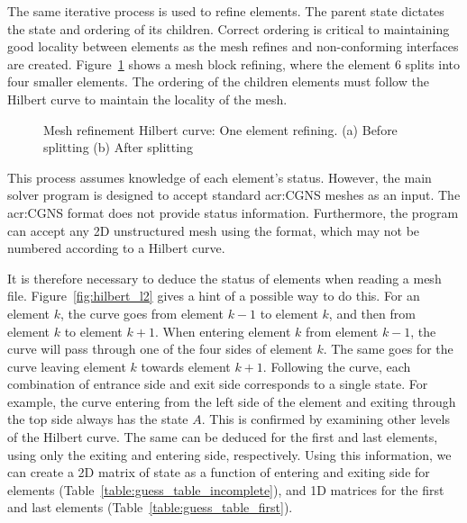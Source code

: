 The same iterative process is used to refine elements. The parent state dictates the state and
ordering of its children. Correct ordering is critical to maintaining good locality between elements
as the mesh refines and non-conforming interfaces are created. Figure~\ref{fig:hilbert_refining}
shows a mesh block refining, where the element \(6\) splits into four smaller elements. The ordering
of the children elements must follow the Hilbert curve to maintain the locality of the mesh.

\begin{figure}[H]
    \centering
    \hfill
    \caption{Mesh refinement Hilbert curve: One element refining. (a) Before splitting (b) After splitting}\label{fig:hilbert_refining}
\end{figure}

This process assumes knowledge of each element's status. However, the main solver program is
designed to accept standard \acrshort{acr:CGNS} meshes as an input. The \acrshort{acr:CGNS} format
does not provide status information. Furthermore, the program can accept any 2D unstructured mesh
using the format, which may not be numbered according to a Hilbert curve. 

It is therefore necessary to deduce the status of elements when reading a mesh file.
Figure~\ref{fig:hilbert_l2} gives a hint of a possible way to do this. For an element \(k\), the
curve goes from element \(k - 1\) to element \(k\), and then from element \(k\) to element \(k +
1\). When entering element \(k\) from element \(k - 1\), the curve will pass through one of the four
sides of element \(k\). The same goes for the curve leaving element \(k\) towards element \(k + 1\).
Following the curve, each combination of entrance side and exit side corresponds to a single state.
For example, the curve entering from the left side of the element and exiting through the top side
always has the state \(A\). This is confirmed by examining other levels of the Hilbert curve. The
same can be deduced for the first and last elements, using only the exiting and entering side,
respectively. Using this information, we can create a 2D matrix of state as a function of entering
and exiting side for elements (Table~\ref{table:guess_table_incomplete}), and 1D matrices for the
first and last elements (Table~\ref{table:guess_table_first}).

